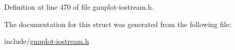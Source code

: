 Definition at line 470 of file gnuplot-\/iostream.\+h.



The documentation for this struct was generated from the following file\+:\begin{DoxyCompactItemize}
\item 
include/\hyperlink{gnuplot-iostream_8h}{gnuplot-\/iostream.\+h}\end{DoxyCompactItemize}
